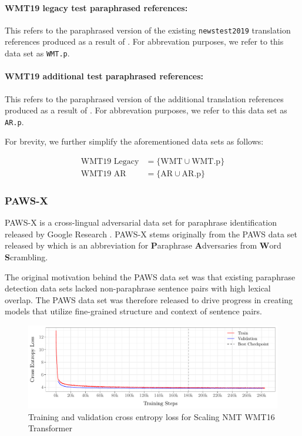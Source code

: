 \documentclass[11pt,a4paper]{article}
\begin{document}
\paragraph{WMT19 legacy test paraphrased references:} This refers to the paraphrased version of the existing \texttt{newstest2019} translation references produced as a result of \citet{freitag-bleu-paraphrase-references-2020}. For abbrevation purposes, we refer to this data set as \texttt{WMT.p}. 

\paragraph{WMT19 additional test paraphrased references:}This refers to the paraphrased version of the additional translation references produced as a result of \citet{freitag-bleu-paraphrase-references-2020}. For abbrevation purposes, we refer to this data set as \texttt{AR.p}.

For brevity, we further simplify the aforementioned data sets as follows:

\vspace{-10pt}
\begin{align}
  \text{WMT19 Legacy} &= \{\text{WMT} \cup \text{WMT.p} \} \\
  \text{WMT19 AR} &= \{\text{AR} \cup \text{AR.p} \}
\end{align}

\subsubsection{PAWS-X}

PAWS-X is a cross-lingual adversarial data set for paraphrase identification released by Google Research \citep{pawsx2019emnlp}. PAWS-X stems originally from the PAWS data set released by \citet{zhang2019paws} which is an abbreviation for \textbf{P}araphrase \textbf{A}dversaries from \textbf{W}ord \textbf{S}crambling.

The original motivation behind the PAWS data set was that existing paraphrase detection data sets lacked non-paraphrase sentence pairs with high lexical overlap. The PAWS data set was therefore released to drive progress in creating models that utilize fine-grained structure and context of sentence pairs.

\begin{figure}
  \centering 
  \includegraphics[trim={0cm 0cm 0cm 0cm},clip,width=\textwidth]{transformer_nmt_evolution.pdf}
  \caption{Training and validation cross entropy loss for Scaling NMT WMT16 Transformer}
  \label{transformer_nmt_evolution}
\end{figure}
\end{document}
